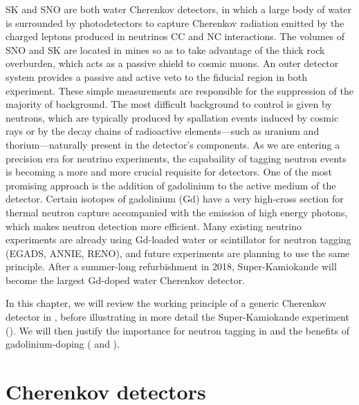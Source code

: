 SK and SNO are both water Cherenkov detectors, in which a large body of water is surrounded by %
photodetectors to capture Cherenkov radiation emitted by the charged leptons produced in neutrinos CC and NC interactions.
The volumes of SNO and SK are located in mines so as to take advantage of the thick rock overburden, %
which acts as a passive shield to cosmic muons.
An outer detector system provides a passive and active veto to the fiducial region in both experiment.
These simple measurements are responsible for the suppression of the majority of background.
The most difficult background to control is given by neutrons, which are typically produced by spallation events %
induced by cosmic rays or by the decay chains of radioactive elements---such as uranium and thorium---naturally %
present in the detector's components.
As we are entering a precision era for neutrino experiments, the capabaility of tagging neutron %
events is becoming a more and more crucial requisite for detectors.
One of the most promising approach is the addition of gadolinium to the active medium of the detector.
Certain isotopes of gadolinium (Gd) have a very high-cross section for thermal neutron capture %
accompanied with the emission of high energy photons, which makes neutron detection more efficient.
Many existing neutrino experiments are already using Gd-loaded water or scintillator for neutron tagging %
(EGADS, ANNIE, RENO), %
and future experiments are planning to use the same principle.
After a summer-long refurbishment in 2018, Super-Kamiokande will become the largest Gd-doped water Cherenkov detector.

In this chapter, we will review the working principle of a generic Cherenkov detector in , %
before illustrating in more detail the Super-Kamiokande experiment ().
We will then justify the importance for neutron tagging in  %
and the benefits of gadolinium-doping ( and ).

\section{Cherenkov detectors}
\label{sec:wch}


